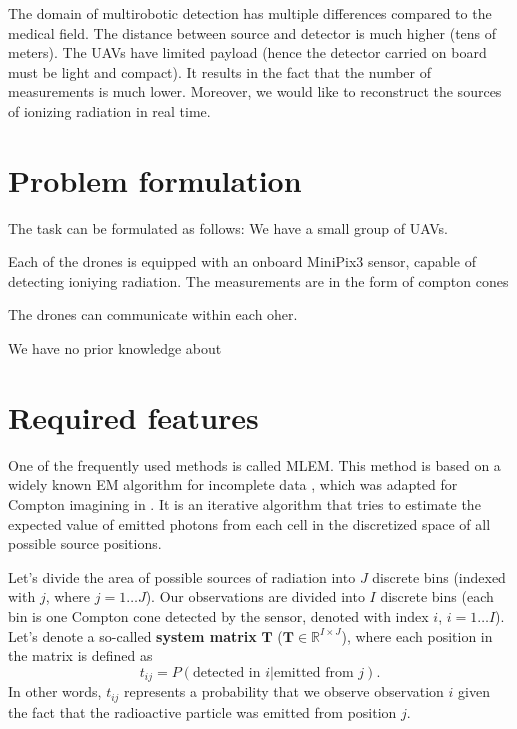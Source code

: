 The domain of multirobotic detection has multiple differences compared to the medical field.
The distance between source and detector is much higher (tens of meters).
The \ac{UAV}s have limited payload (hence the detector carried on board must be light and compact).
It results in the fact that the number of measurements is much lower.
Moreover, we would like to reconstruct the sources of ionizing radiation in real time.

\section{Problem formulation}
The task can be formulated as follows:
We have a small group of \ac{UAV}s.

Each of the drones is equipped with an onboard MiniPix3 sensor, capable of detecting ioniying radiation.
The measurements are in the form of compton cones

The drones can communicate within each oher. 

We have no prior knowledge about 










\section{Required features}

One of the frequently used methods is called \ac{MLEM}.
This method is based on a widely known EM algorithm for incomplete data \cite{EM}, which was adapted for Compton imagining in \cite{wilderman}.
It is an iterative algorithm that tries to estimate the expected value of emitted photons from each cell in the discretized space of all possible source positions.

Let's divide the area of possible sources of radiation into $J$ discrete bins (indexed with $j$, where $j = 1 \dotsc J$).
Our observations are divided into $I$ discrete bins (each bin is one Compton cone detected by the sensor, denoted with index $i$, $i = 1 \dotsc I$).
Let's denote a so-called \textbf{system matrix} $\mathbf{T}$ ($\mathbf{T} \in \mathbb{R}^{I \times J}$), where each position in the matrix is defined as
\begin{equation}
  t_{ij} =  P(\textrm{detected in } i | \textrm{emitted from } j).
\end{equation}
In other words, $t_{ij}$ represents a probability that we observe observation $i$ given the fact that the radioactive particle was emitted from position $j$.

